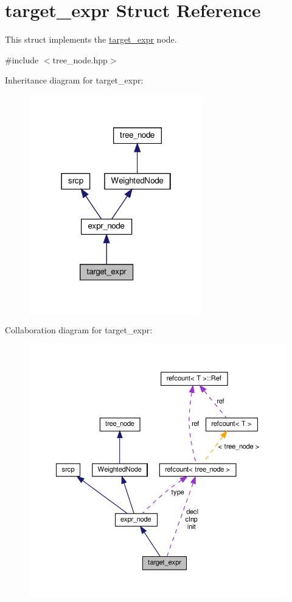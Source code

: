 \hypertarget{structtarget__expr}{}\section{target\+\_\+expr Struct Reference}
\label{structtarget__expr}


This struct implements the \hyperlink{structtarget__expr}{target\+\_\+expr} node.  




{\ttfamily \#include $<$tree\+\_\+node.\+hpp$>$}



Inheritance diagram for target\+\_\+expr\+:
\nopagebreak
\begin{figure}[H]
\begin{center}
\leavevmode
\includegraphics[width=214pt]{d7/d02/structtarget__expr__inherit__graph}
\end{center}
\end{figure}


Collaboration diagram for target\+\_\+expr\+:
\nopagebreak
\begin{figure}[H]
\begin{center}
\leavevmode
\includegraphics[width=350pt]{dc/d30/structtarget__expr__coll__graph}
\end{center}
\end{figure}
